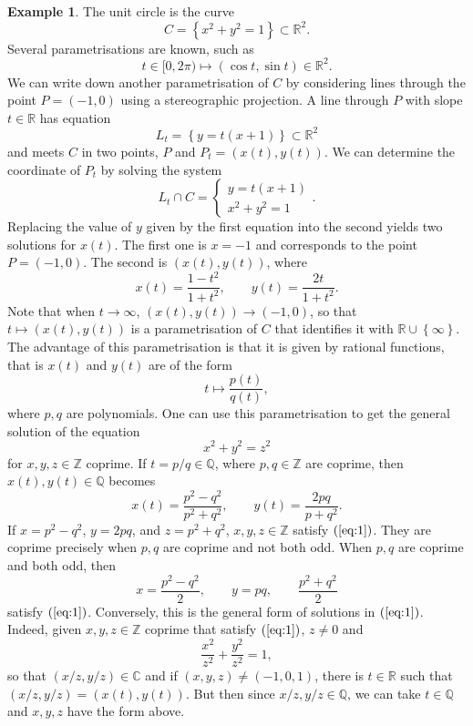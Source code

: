 \documentclass{article}
\newcommand{\Z}{\mathbb{Z}}
\newcommand{\Q}{\mathbb{Q}}
\newcommand{\R}{\mathbb{R}}
\newcommand{\C}{\mathbb{C}}
\newcommand{\rb}[1]{\left( #1 \right)}
\newcommand{\cb}[1]{\left\{ #1 \right\}}
\theoremstyle{definition}\newtheorem{definition}{Definition}[section]
\theoremstyle{definition}\newtheorem{notation}[definition]{Notation}
\theoremstyle{definition}\newtheorem{remark}[definition]{Remark}
\theoremstyle{definition}\newtheorem{example}[definition]{Example}
\theoremstyle{definition}\newtheorem{fact}{Fact}
\theoremstyle{definition}\newtheorem{exercise}{Exercise}
\begin{document}
\begin{example}
The unit circle is the curve
$$ C = \cb{x^2 + y^2 = 1} \subset \R^2. $$
Several parametrisations are known, such as
$$ t \in [0, 2\pi) \mapsto \rb{\cos t, \sin t} \in \R^2. $$
We can write down another parametrisation of $ C $ by considering lines through the point $ P = \rb{-1, 0} $ using a stereographic projection. A line through $ P $ with slope $ t \in \R $ has equation
$$ L_t = \cb{y = t\rb{x + 1}} \subset \R^2 $$
and meets $ C $ in two points, $ P $ and $ P_t = \rb{x\rb{t}, y\rb{t}} $. We can determine the coordinate of $ P_t $ by solving the system
$$ L_t \cap C = \begin{cases} y = t\rb{x + 1} \\ x^2 + y^2 = 1 \end{cases}. $$
Replacing the value of $ y $ given by the first equation into the second yields two solutions for $ x\rb{t} $. The first one is $ x = -1 $ and corresponds to the point $ P = \rb{-1, 0} $. The second is $ \rb{x\rb{t}, y\rb{t}} $, where
$$ x\rb{t} = \dfrac{1 - t^2}{1 + t^2}, \qquad y\rb{t} = \dfrac{2t}{1 + t^2}. $$
Note that when $ t \to \infty $, $ \rb{x\rb{t}, y\rb{t}} \to \rb{-1, 0} $, so that $ t \mapsto \rb{x\rb{t}, y\rb{t}} $ is a parametrisation of $ C $ that identifies it with $ \R \cup \cb{\infty} $. The advantage of this parametrisation is that it is given by rational functions, that is $ x\rb{t} $ and $ y\rb{t} $ are of the form
$$ t \mapsto \dfrac{p\rb{t}}{q\rb{t}}, $$
where $ p, q $ are polynomials. One can use this parametrisation to get the general solution of the equation
\begin{equation}
\label{eq:1}
x^2 + y^2 = z^2
\end{equation}
for $ x, y, z \in \Z $ coprime. If $ t = p / q \in \Q $, where $ p, q \in \Z $ are coprime, then $ x\rb{t}, y\rb{t} \in \Q $ becomes
$$ x\rb{t} = \dfrac{p^2 - q^2}{p^2 + q^2}, \qquad y\rb{t} = \dfrac{2pq}{p + q^2}. $$
If $ x = p^2 - q^2 $, $ y = 2pq $, and $ z = p^2 + q^2 $, $ x, y, z \in \Z $ satisfy $ \rb{\ref{eq:1}} $. They are coprime precisely when $ p, q $ are coprime and not both odd. When $ p, q $ are coprime and both odd, then
$$ x = \dfrac{p^2 - q^2}{2}, \qquad y = pq, \qquad \dfrac{p^2 + q^2}{2} $$
satisfy $ \rb{\ref{eq:1}} $. Conversely, this is the general form of solutions in $ \rb{\ref{eq:1}} $. Indeed, given $ x, y, z \in \Z $ coprime that satisfy $ \rb{\ref{eq:1}} $, $ z \ne 0 $ and
$$ \dfrac{x^2}{z^2} + \dfrac{y^2}{z^2} = 1, $$
so that $ \rb{x / z, y / z} \in \C $ and if $ \rb{x, y, z} \ne \rb{-1, 0, 1} $, there is $ t \in \R $ such that $ \rb{x / z, y / z} = \rb{x\rb{t}, y\rb{t}} $. But then since $ x / z, y / z \in \Q $, we can take $ t \in \Q $ and $ x, y, z $ have the form above.
\end{example}
\end{document}
